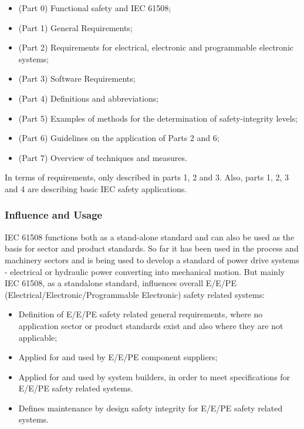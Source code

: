 \documentclass[conference]{IEEEtran}
\begin{document}
\begin{itemize}
    \item (Part 0) Functional safety and IEC 61508;
    \item (Part 1) General Requirements;
    \item (Part 2) Requirements for electrical, electronic and programmable electronic systems;
    \item (Part 3) Software Requirements;
    \item (Part 4) Definitions and abbreviations;
    \item (Part 5) Examples of methods for the determination of safety-integrity levels;
    \item (Part 6) Guidelines on the application of Parts 2 and 6;
    \item (Part 7) Overview of techniques and measures.
\end{itemize}

In terms of requirements, only described in parts 1, 2 and 3. Also, parts 1, 2, 3 and 4 are describing basic IEC safety applications.

\subsubsection{Influence and Usage}

IEC 61508 functions both as a stand-alone standard and can also be used as the basis for sector and product standards. So far it has been used in the process and machinery sectors and is being used to develop a standard of power drive systems - electrical or hydraulic power converting into mechanical motion. But mainly IEC 61508, as a standalone standard, influences overall E/E/PE (Electrical/Electronic/Programmable Electronic) safety related systems:

\begin{itemize}
    \item Definition of E/E/PE safety related general requirements, where no application sector or product standards exist and also where they are not applicable;
    \item Applied for and used by E/E/PE component suppliers;
    \item Applied for and used by system builders, in order to meet specifications for E/E/PE safety related systems.
    \item Defines maintenance by design safety integrity for E/E/PE safety related systems.
\end{itemize}
\end{document}
